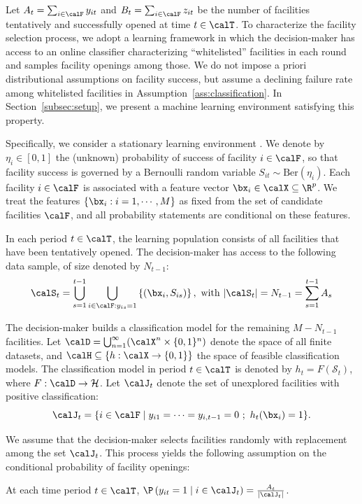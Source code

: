 \documentclass[blindrev]{informs3noheader}
\begin{document}
Let $A_t=\sum_{i\in\calF}y_{it}$ and $B_t=\sum_{i\in\calF}z_{it}$ be the number of facilities tentatively and successfully opened at time $t\in\calT$. To characterize the facility selection process, we adopt a learning framework in which the decision-maker has access to an online classifier characterizing ``whitelisted'' facilities in each round and samples facility openings among those. We do not impose a priori distributional assumptions on facility success, but assume a declining failure rate among whitelisted facilities in Assumption~\ref{ass:classification}. In Section~\ref{subsec:setup}, we present a machine learning environment satisfying this property.

Specifically, we consider a stationary learning environment \citep[e.g.,][]{auer2002using, agrawal2012analysis}. We denote by $\eta_{i} \in [0,1]$ the (unknown) probability of success of facility $i\in\calF$, so that facility success is governed by a Bernoulli random variable $S_{it}\sim \text{Ber}(\eta_{i})$. Each facility $i\in\calF$ is associated with a feature vector $\bx_{i} \in \calX\subseteq\R^{p}$. We treat the features $\{\bx_i:i=1,\cdots,M\}$ as fixed from the set of candidate facilities $\calF$, and all probability statements are conditional on these features.

In each period $t\in\calT$, the learning population consists of all facilities that have been tentatively opened. The decision-maker has access to the following data sample, of size denoted by $N_{t-1}$:
$$\calS_t=\bigcup_{s=1}^{t-1}\bigcup_{i\in\calF:y_{is}=1}\left\{(\bx_{i},S_{is})\right\},\ \text{with}\ |\calS_t|=N_{t-1}=\sum_{s=1}^{t-1}A_s$$

The decision-maker builds a classification model for the remaining $M-N_{t-1}$ facilities. Let $\calD = \bigcup_{n=1}^\infty (\calX^n\times\{0,1\}^n)$ denote the space of all finite datasets, and $\calH \subseteq \{h:\calX\to\{0,1\}\}$ the space of feasible classification models. The classification model in period $t\in\calT$ is denoted by $h_t = F(\mathcal{S}_t)$, where $F: \calD \to \mathcal{H}$. Let $\calJ_t$ denote the set of unexplored facilities with positive classification:
\begin{equation}
    \calJ_t=\{i\in\calF\mid y_{i1}=\cdots=y_{i,t-1}=0\ ;\ h_t(\bx_{i})=1\}.\label{eq:Jt}
\end{equation}

We assume that the decision-maker selects facilities randomly with replacement among the set $\calJ_t$. This process yields the following assumption on the conditional probability of facility openings:
\begin{assumption}[Sampling]\label{ass:sampling}
    At each time period $t\in\calT$, $\P\left(y_{it}=1 \mid i \in \calJ_t\right)= 
    \frac{A_t}{|\calJ_t|}$.
\end{assumption}
\end{document}
